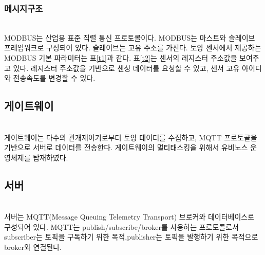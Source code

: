 \documentclass[11pt]{article}
\begin{document}
\subsubsection{메시지구조}
\indent \\MODBUS는 산업용 표준 직렬 통신 프로토콜이다. MODBUS는 마스트와 슬레이브 프레임워크로 구성되어 있다. 슬레이브는 고유 주소를 가진다. 토양 센서에서 제공하는 MODBUS 기본 파라미터는 표\ref{t1}과 같다. 표\ref{t2}는 센서의 레지스터 주소값을 보여주고 있다. 레지스터 주소값을 기반으로 센싱 데이터를 요청할 수 있고, 센서 고유 아이디와 전송속도를 변경할 수 있다. %
 

\subsection{게이트웨이}
\indent \\게이트웨이는 다수의 관개제어기로부터 토양 데이터를 수집하고, MQTT 프로토콜을 기반으로 서버로 데이터를 전송한다. 게이트웨이의 멀티태스킹을 위해서 유비노스 운영체제를 탑재하였다. 

\subsection{서버}
\indent \\서버는 MQTT(Message Queuing Telemetry Transport) 브로커와 데이터베이스로 구성되어 있다. MQTT는 publish/subscribe/broker를 사용하는 프로토콜로서 subscriber는 토픽을 구독하기 위한 목적,publisher는 토픽을 발행하기 위한 목적으로 broker와 연결된다. 
\end{document}
